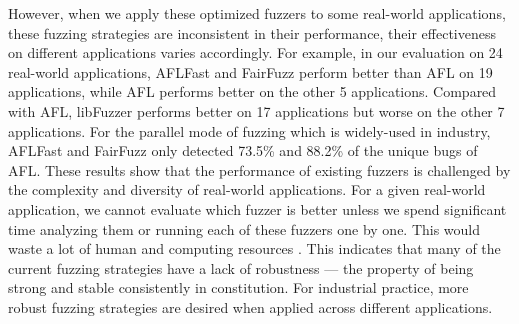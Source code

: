 However, when we apply these optimized fuzzers to some real-world applications, these fuzzing strategies are inconsistent in their performance, their effectiveness on different applications varies accordingly. For example, in our evaluation on 24 real-world applications, AFLFast and FairFuzz perform better than AFL on 19 applications, while AFL performs better on the other 5 applications. Compared with AFL, libFuzzer performs better on 17 applications but worse on the other 7 applications.
For the parallel mode of fuzzing which is widely-used in industry, AFLFast and FairFuzz  only detected  73.5\%  and 88.2\% of the unique bugs of AFL. 
These results show that the performance of existing fuzzers is challenged by the complexity and diversity of real-world applications. For a given real-world application, we cannot evaluate which fuzzer is better unless we spend significant time analyzing them or running each of these fuzzers one by one. This would waste a lot of human and computing resources \cite{klees2018evaluating}. 
This indicates that many of the current fuzzing strategies have a lack of robustness --- the property of being strong and stable consistently in constitution.  For industrial practice, more robust fuzzing strategies are desired when applied across different applications. 


